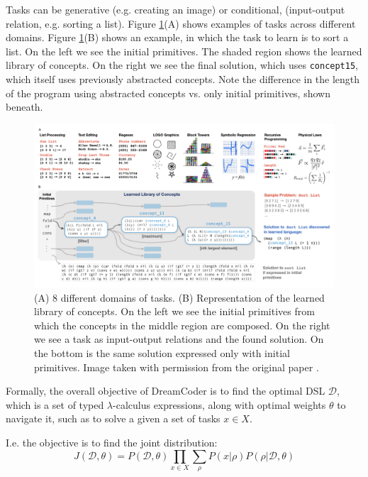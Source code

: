 Tasks can be generative (e.g. creating an image) or conditional, (input-output relation, e.g. sorting a list).
Figure \ref{fig:conc_library}(A) shows examples of tasks across different domains. 
Figure \ref{fig:conc_library}(B) shows an example, in which the task to learn is to sort a list. On the left we see the initial primitives. The shaded region shows the learned library of concepts. On the right we see the final solution, which uses \texttt{concept15}, which itself uses previously abstracted concepts. Note the difference in the length of the program using abstracted concepts vs. only initial primitives, shown beneath.

\begin{figure}[h]
    \centering
    \includegraphics[width=\textwidth]{../img/conc_library.png}
    \caption{(A) 8 different domains of tasks. (B) Representation of the learned library of concepts. On the left we see the initial primitives from which the concepts in the middle region are composed. On the right we see a task as input-output relations and the found solution. On the bottom is the same solution expressed only with initial primitives. Image taken with permission from the original paper \cite{ellis_dreamcoder_2021}.}
    \label{fig:conc_library}
\end{figure}

Formally, the overall objective of DreamCoder is to find the optimal DSL \(\mathcal{D}\), which is a set of typed \(\lambda\)-calculus expressions, along with optimal weights \( \theta \) to navigate it, such as to solve a given a set of tasks \(x \in X\).

I.e. the objective is to find the joint distribution:
\begin{equation}
    J(\mathcal{D}, \theta) = P(\mathcal{D}, \theta) \prod_{x \in X} \sum_{\rho} P(x|\rho)P(\rho|\mathcal{D},\theta) 
\end{equation}

